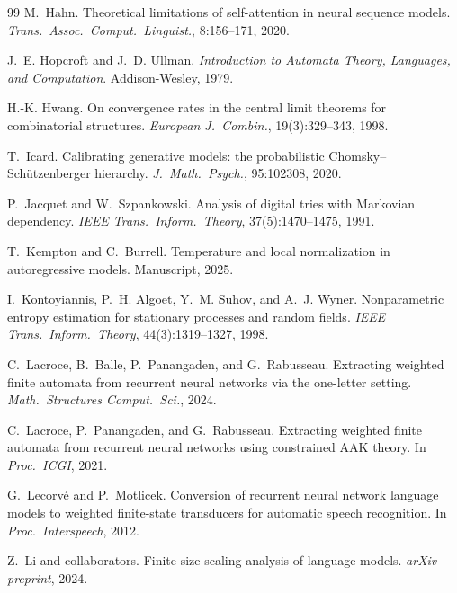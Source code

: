 \begin{thebibliography}{99}
M.~Hahn.
\newblock Theoretical limitations of self-attention in neural sequence models.
\newblock \emph{Trans.\ Assoc.\ Comput.\ Linguist.}, 8:156--171, 2020.

J.~E. Hopcroft and J.~D. Ullman.
\newblock \emph{Introduction to Automata Theory, Languages, and Computation}.
\newblock Addison-Wesley, 1979.

H.-K. Hwang.
\newblock On convergence rates in the central limit theorems for combinatorial structures.
\newblock \emph{European J.\ Combin.}, 19(3):329--343, 1998.

T.~Icard.
\newblock Calibrating generative models: the probabilistic {C}homsky--{S}ch\"utzenberger hierarchy.
\newblock \emph{J.\ Math.\ Psych.}, 95:102308, 2020.

P.~Jacquet and W.~Szpankowski.
\newblock Analysis of digital tries with {M}arkovian dependency.
\newblock \emph{IEEE Trans.\ Inform.\ Theory}, 37(5):1470--1475, 1991.

T.~Kempton and C.~Burrell.
\newblock Temperature and local normalization in autoregressive models.
\newblock Manuscript, 2025.

I.~Kontoyiannis, P.~H. Algoet, Y.~M. Suhov, and A.~J. Wyner.
\newblock Nonparametric entropy estimation for stationary processes and random fields.
\newblock \emph{IEEE Trans.\ Inform.\ Theory}, 44(3):1319--1327, 1998.

C.~Lacroce, B.~Balle, P.~Panangaden, and G.~Rabusseau.
\newblock Extracting weighted finite automata from recurrent neural networks via the one-letter setting.
\newblock \emph{Math.\ Structures Comput.\ Sci.}, 2024.

C.~Lacroce, P.~Panangaden, and G.~Rabusseau.
\newblock Extracting weighted finite automata from recurrent neural networks using constrained {AAK} theory.
\newblock In \emph{Proc.\ ICGI}, 2021.

G.~Lecorv\'e and P.~Motlicek.
\newblock Conversion of recurrent neural network language models to weighted finite-state transducers for automatic speech recognition.
\newblock In \emph{Proc.\ Interspeech}, 2012.

Z.~Li and collaborators.
\newblock Finite-size scaling analysis of language models.
\newblock \emph{arXiv preprint}, 2024.


\end{thebibliography}

